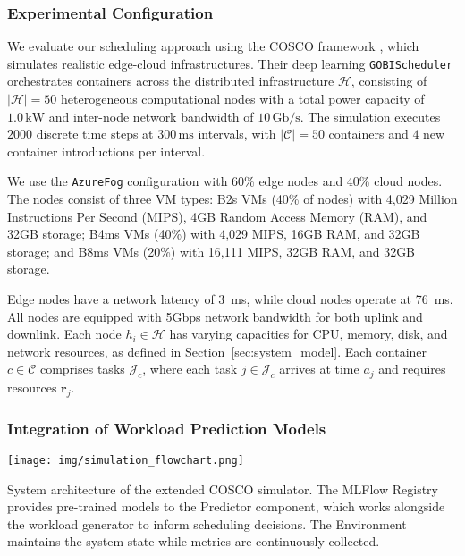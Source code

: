 \documentclass{ieeetmlcn}
\begin{document}
\subsubsection{Experimental Configuration}

We evaluate our scheduling approach using the COSCO framework \cite{tuli2021cosco}, which simulates realistic edge-cloud infrastructures. Their deep learning \texttt{GOBIScheduler} orchestrates containers across the distributed infrastructure $\mathcal{H}$, consisting of $|\mathcal{H}| = 50$ heterogeneous computational nodes with a total power capacity of $1.0\,\text{kW}$ and inter-node network bandwidth of $10\,\text{Gb}/\text{s}$. The simulation executes $2000$ discrete time steps at $300\,\text{ms}$ intervals, with $|\mathcal{C}| = 50$ containers and $4$ new container introductions per interval.

 We use the \texttt{AzureFog} configuration with 60\% edge nodes and 40\% cloud nodes. The nodes consist of three VM types: B2s VMs (40\% of nodes) with 4,029 Million Instructions Per Second (MIPS), 4GB Random Access Memory (RAM), and 32GB storage; B4ms VMs (40\%) with 4,029 MIPS, 16GB RAM, and 32GB storage; and B8ms VMs (20\%) with 16,111 MIPS, 32GB RAM, and 32GB storage.

Edge nodes have a network latency of \SI{3}{\milli\second}, while cloud nodes operate at \SI{76}{\milli\second}. All nodes are equipped with 5Gbps network bandwidth for both uplink and downlink. Each node $h_i \in \mathcal{H}$ has varying capacities for CPU, memory, disk, and network resources, as defined in Section~\ref{sec:system_model}. Each container $c \in \mathcal{C}$ comprises tasks $\mathcal{J}_c$, where each task $j \in \mathcal{J}_c$ arrives at time $a_j$ and requires resources $\mathbf{r}_j$.


\subsubsection{Integration of Workload Prediction Models}

\par\medskip\begin{center}\centering
\texttt{[image: img/simulation\_flowchart.png]}
\caption{System architecture of the extended COSCO simulator. The MLFlow Registry provides pre-trained models to the Predictor component, which works alongside the workload generator to inform scheduling decisions. The Environment maintains the system state while metrics are continuously collected.}
\label{fig:simulation_flowchart}\end{center}\medskip\par
\end{document}
